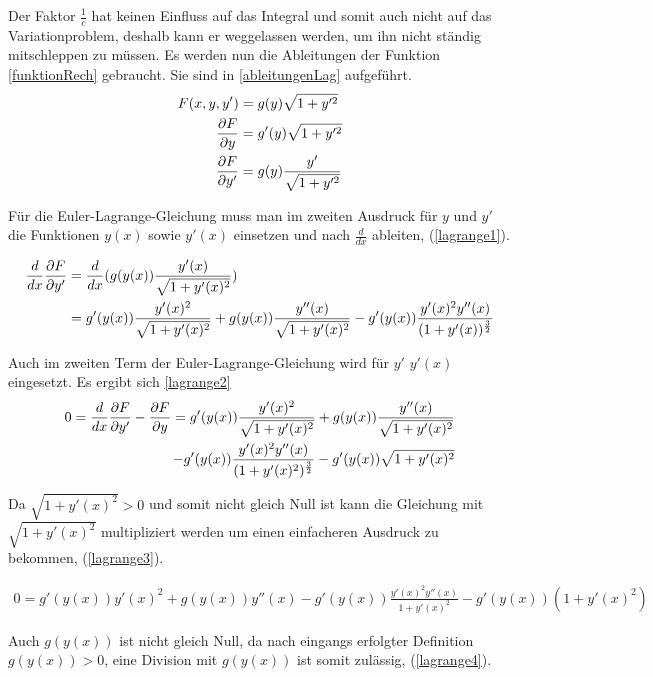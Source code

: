 Der Faktor $\frac{1}{c}$ hat keinen Einfluss auf das Integral und somit auch nicht auf das Variationproblem, deshalb kann er weggelassen werden, um ihn nicht ständig mitschleppen zu müssen.
Es werden nun die Ableitungen der Funktion \ref{funktionRech} gebraucht. Sie sind in \ref{ableitungenLag} aufgeführt.
\begin{align}
	F(x,y,y') &= g(y) \sqrt{1 + y'^2} \label{funktionRech} \\
	\frac{\partial F}{\partial y} &= g'(y) \sqrt{1 + y'^2} \notag \\
	\frac{\partial F}{\partial y'} &= g(y) \frac{y'}{\sqrt{1 + y'^2}}
	\label{ableitungenLag}
\end{align}

Für die Euler-Lagrange-Gleichung muss man im zweiten Ausdruck für $y$ und $y'$ die Funktionen $y(x)$ 
sowie $y'(x)$ einsetzen und nach $\frac{d}{dx}$ ableiten, (\eqref{lagrange1}).

\begin{align}
	\frac{d}{dx} \frac{\partial F}{\partial y'} &= \frac{d}{dx} (g(y(x)) \frac{y'(x)}{\sqrt{1 + y'(x)^2}}) \notag \\ 
	&= g'(y(x)) \frac{y'(x)^2}{\sqrt{1 + y'(x)^2}} + g(y(x)) \frac{y''(x)}{\sqrt{1 + y'(x)^2}}
	 - g'(y(x)) \frac{y'(x)^2 y''(x)}{(1 + y'(x))^\frac{3}{2}} 
	 \label{lagrange1}
\end{align}

Auch im zweiten Term der Euler-Lagrange-Gleichung wird für $y'$ $y'(x)$ eingesetzt. Es ergibt sich \eqref{lagrange2}
\begin{align}
	0 = \frac{d}{dx} \frac{\partial F}{\partial y'} - \frac{\partial F}{\partial y}
	= g'(y(x)) \frac{y'(x)^2}{\sqrt{1 + y'(x)^2}} + g(y(x)) \frac{y''(x)}{\sqrt{1 + y'(x)^2}} \notag \\
	- g'(y(x)) \frac{y'(x)^2 y''(x)}{(1 + y'(x)^2)^\frac{3}{2}}  - g'(y(x)) \sqrt{1 + y'(x)^2}
	\label{lagrange2}
\end{align}

Da $\sqrt{1 + y'(x)^2} > 0$ und somit nicht gleich Null ist kann die Gleichung mit $\sqrt{1 + y'(x)^2}$  multipliziert werden um einen einfacheren Ausdruck zu bekommen, (\eqref{lagrange3}).

\begin{align}
	0 = g'(y(x)) y'(x)^2 + g(y(x)) y''(x) - g'(y(x)) \frac{y'(x)^2 y''(x)}{1 + y'(x)^2} - g'(y(x)) (1 + y'(x)^2)
	\label{lagrange3}
\end{align}

Auch $g(y(x))$ ist nicht gleich Null, da nach eingangs erfolgter Definition $g(y(x)) > 0$, eine Division mit $g(y(x))$ ist somit zulässig, (\eqref{lagrange4}).

